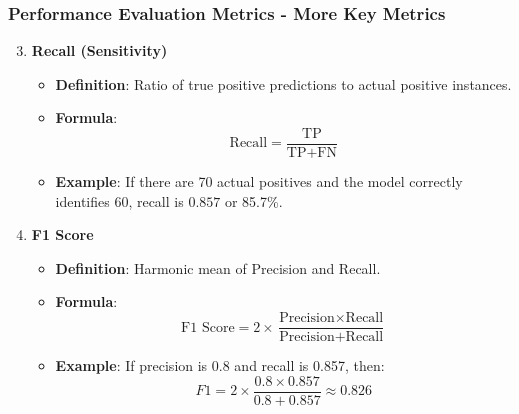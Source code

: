 \documentclass[aspectratio=169]{beamer}
\begin{document}
\begin{frame}[fragile]
    \frametitle{Performance Evaluation Metrics - More Key Metrics}
    \begin{enumerate}
        \setcounter{enumi}{2} %
        \item \textbf{Recall (Sensitivity)}
            \begin{itemize}
                \item \textbf{Definition}: Ratio of true positive predictions to actual positive instances.
                \item \textbf{Formula}:
                    \[
                    \text{Recall} = \frac{\text{TP}}{\text{TP} + \text{FN}}
                    \]
                \item \textbf{Example}: If there are 70 actual positives and the model correctly identifies 60, recall is \( 0.857 \) or 85.7\%.
            \end{itemize}

        \item \textbf{F1 Score}
            \begin{itemize}
                \item \textbf{Definition}: Harmonic mean of Precision and Recall.
                \item \textbf{Formula}:
                    \[
                    \text{F1 Score} = 2 \times \frac{\text{Precision} \times \text{Recall}}{\text{Precision} + \text{Recall}}
                    \]

                \item \textbf{Example}: If precision is 0.8 and recall is 0.857, then:
                    \[
                    F1 = 2 \times \frac{0.8 \times 0.857}{0.8 + 0.857} \approx 0.826
                    \]
            \end{itemize}
    \end{enumerate}
\end{frame}
\end{document}
